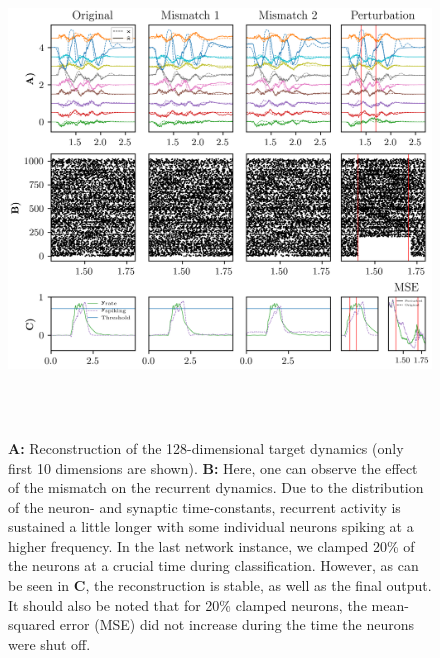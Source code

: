 \documentclass[twoside,11pt,titlepage]{article}
\begin{document}
\begin{figure}[!htb]
  \includegraphics[width = \columnwidth, height=13cm]{figures/figure4.png}
  \caption{\textbf{A:} Reconstruction of the 128-dimensional target dynamics (only first 10 dimensions are shown). \textbf{B:} Here,
  one can observe the effect of the mismatch on the recurrent dynamics. Due to the distribution of the neuron- and synaptic
  time-constants, recurrent activity is sustained a little longer with some individual neurons spiking at a higher frequency.
  In the last network instance, we clamped 20\% of the neurons at a crucial time during classification. However, as can be seen
  in \textbf{C}, the reconstruction is stable, as well as the final output. It should also be noted that
  for 20\% clamped neurons, the mean-squared error (MSE) did not increase during the time the neurons were shut off.}
  \label{fig:figure4}
\end{figure}

\clearpage
\end{document}
